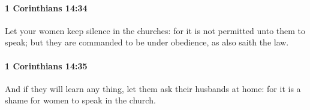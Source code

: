 		\paragraph{1 Corinthians 14:34} %
			\label{1CORINTHIANS-14-34}

			Let your women keep silence in the churches: for it is not permitted unto them to speak; but they are commanded to be under obedience, as also saith the law.

			\begin{framed}
				\scriptsize
				\begin{compactdesc}
					\item[SBLG] 
				\end{compactdesc}
			\end{framed}

		\paragraph{1 Corinthians 14:35} %
			\label{1CORINTHIANS-14-35}

			And if they will learn any thing, let them ask their husbands at home: for it is a shame for women to speak in the church.

